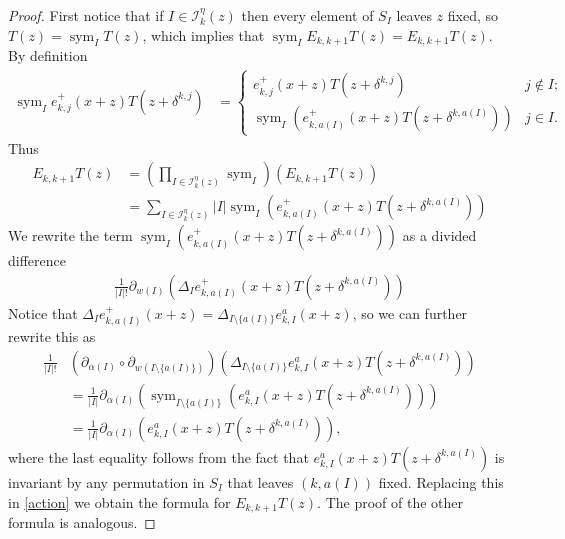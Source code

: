 \documentclass[11pt,fleqn]{article}
\newcommand\I{\mathcal I}
\DeclareMathOperator\sym{sym}
\begin{document}
\begin{proof}
First notice that if $I \in \I_k^\eta(z)$ then every element of $S_I$ leaves 
$z$ fixed, so $T(z) = \sym_I T(z)$, which implies that $\sym_I E_{k,k+1} T(z)
= E_{k,k+1} T(z)$. By definition
\begin{align*}
\sym_I e_{k,j}^+(x+z) T(z+\delta^{k,j}) 
&= \begin{cases}
e_{k,j}^+(x+z) T(z+\delta^{k,j}) & j \notin I; \\
\sym_I(e_{k,a(I)}^+(x+z) T(z + \delta^{k, a(I)})) & j \in I.
\end{cases}
\end{align*}
Thus 
\begin{align}
\label{action}
\tag{1}
E_{k,k+1} T(z)
	&= \left( 
		\prod_{I \in \I_k^\eta(z)} \sym_I 
	\right) (E_{k,k+1} T(z))\\
	&= \sum_{I \in \I_k^\eta(z)} 
		|I| \sym_I(e_{k,a(I)}^+(x+z) T(z+ \delta^{k, a(I)}))
\end{align}
We rewrite the term $\sym_I(e_{k,a(I)}^+(x+z) T(z+ \delta^{k, a(I)}))$ as a 
divided difference
\begin{align*}
\frac{1}{|I|!}
	\partial_{w(I)}(\Delta_I e_{k,a(I)}^+(x+z) T(z+ \delta^{k, a(I)}))
\end{align*}
Notice that $\Delta_I e_{k,a(I)}^+(x+z) = \Delta_{I \setminus \{a(I)\}} 
e_{k,I}^a(x+z)$, so we can further rewrite this as
\begin{align*}
\frac{1}{|I|!}
	&(\partial_{\alpha(I)} \circ \partial_{w(I \setminus \{a(I)\})})
	(\Delta_{I\setminus \{a(I)\}} e_{k,I}^a(x+z) T(z+ \delta^{k, a(I)})) \\
&= \frac{1}{|I|}
	\partial_{\alpha(I)} (\sym_{I \setminus \{a(I)\}}
	(e_{k,I}^a(x+z) T(z+ \delta^{k, a(I)})))\\
&= \frac{1}{|I|} \partial_{\alpha(I)} 
	(e_{k,I}^a(x+z) T(z+ \delta^{k, a(I)})),
\end{align*}
where the last equality follows from the fact that $e_{k,I}^a(x+z) 
T(z+ \delta^{k, a(I)})$ is invariant by any permutation in $S_I$ that leaves
$(k,a(I))$ fixed. Replacing this in \ref{action} we obtain the formula for
$E_{k,k+1}T(z)$. The proof of the other formula is analogous.
\end{proof}
\end{document}
